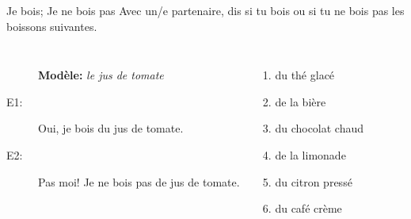 \begin{frame}{Je bois; Je ne bois pas}
  Avec un/e partenaire, dis si tu bois ou si tu ne bois pas les boissons suivantes. \\
  \begin{columns}
      \begin{description}
        \item[] \textbf{Modèle:} \emph{le jus de tomate}
        \item[E1:] Oui, je bois du jus de tomate.
        \item[E2:] Pas moi! Je ne bois pas de jus de tomate.
      \end{description}
      \begin{enumerate}
        \item du thé glacé
        \item de la bière
        \item du chocolat chaud
        \item de la limonade
        \item du citron pressé
        \item du café crème
      \end{enumerate}
  \end{columns}
\end{frame}